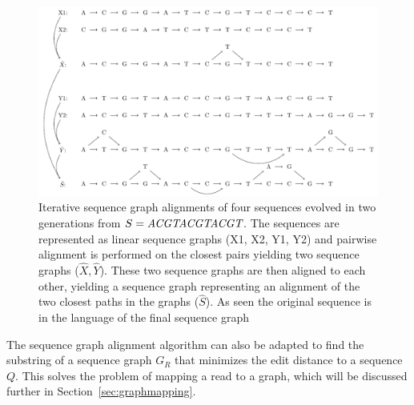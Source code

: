 \begin{figure}
  \includegraphics[width=\textwidth]{figures/graph_msa}

  \caption{
    Iterative sequence graph alignments of four sequences evolved in two generations from $S=\emph{ACGTACGTACGT}$.
    The sequences are represented as linear sequence graphs (X1, X2, Y1, Y2) and pairwise alignment is performed on the closest pairs yielding two sequence graphs ($\hat{X}, \hat{Y}$).
    These two sequence graphs are then aligned to each other, yielding a sequence graph representing an alignment of the two closest paths in the graphs ($\hat{S}$).
    As seen the original sequence is in the language of the final sequence graph}
  \label{fig:treealign}
\end{figure}

The sequence graph alignment algorithm can also be adapted to find the substring of a sequence graph $G_R$ that minimizes the edit distance to a sequence $Q$.
This solves the problem of mapping a read to a graph, which will be discussed further in Section~\ref{sec:graphmapping}.


